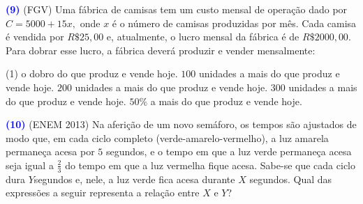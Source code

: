 \documentclass[12pt, a4paper]{article}
\newcommand{\negrito}[1]{\mbox{\boldmath{$#1$}}}
\begin{document}
\textcolor{blue}{\bf(9)} (FGV) Uma fábrica de camisas tem um custo mensal de operação dado por $C = 5000 + 15x,$ onde $x$ é o número de camisas produzidas por mês. Cada camisa é vendida por
$R\$ 25, 00$ e, atualmente, o lucro mensal da fábrica é de $R\$ 2000, 00.$ Para dobrar esse
lucro, a fábrica deverá produzir e vender mensalmente:
\begin{tasks}[counter-format={(tsk[a])},label-width=3.6ex, label-format = {\bfseries}, column-sep = {0pt}](1)
\task[\textcolor{Floresta}{$\negrito{(a)} $}] o dobro do que produz e vende hoje.
\task[\textcolor{Floresta}{$\negrito{(b)} $}] $100$ unidades a mais do que produz e vende hoje.
\task[\textcolor{Floresta}{$\negrito{(c)} $}] $200$ unidades a mais do que produz e vende hoje.
\task[\textcolor{Floresta}{$\negrito{(d)} $}] $300$ unidades a mais do que produz e vende hoje.
\task[\textcolor{Floresta}{$\negrito{(e)} $}] $50\%$ a mais do que produz e vende hoje.
\end{tasks}
\textcolor{blue}{\bf(10)} (ENEM 2013) Na aferição de um novo semáforo, os tempos são ajustados de modo que, em cada ciclo completo (verde-amarelo-vermelho), a luz amarela permaneça acesa por $5$ segundos, e o tempo em que a luz verde permaneça acesa seja igual a $\frac{2}{3}$ do tempo em que a luz vermelha fique acesa. Sabe-se que cada ciclo dura $Y$segundos e, nele, a luz
verde fica acesa durante $X$ segundos. Qual das expressões a seguir representa a
relação entre $X$ e $Y$?
\end{document}
